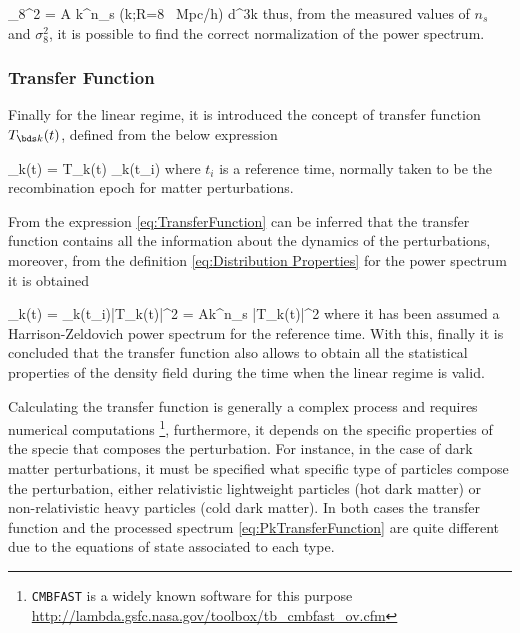 { \sigma_8^2 = A\int {} k^{n_s}
 (k;R=8 \mbox{ Mpc}/h) d^3\bds k }
thus, from the measured values of $n_s$ and $\sigma_8^2$, it is possible
to find the correct normalization of the power spectrum.



			\subsubsection*{Transfer Function}
			

Finally for the linear regime, it is introduced the concept of transfer 
function $T_{\bds k}(t)$, defined from the below expression


{ \delta_{\bds k}(t) = T_{\bds k}(t) \delta_{\bds k}(t_i) }
where $t_i$ is a reference time, normally taken to be the recombination 
epoch for matter perturbations.


From the expression \ref{eq:TransferFunction} can be inferred that the 
transfer function contains all the information about the dynamics of the
perturbations, moreover, from the definition \ref{eq:Distribution 
Properties} for the power spectrum it is obtained


{ \sigma_k(t) = \sigma_k(t_i)|T_k(t)|^2 = Ak^{n_s} |T_k(t)|^2 }
where it has been assumed a Harrison-Zeldovich power spectrum for the 
reference time. With this, finally it is concluded that the transfer 
function also allows to obtain all the statistical properties of the 
density field during the time when the linear regime is valid.


Calculating the transfer function is generally a complex process and 
requires numerical computations \footnote{\texttt{CMBFAST} is a 
widely known software for this purpose 
\url{http://lambda.gsfc.nasa.gov/toolbox/tb_cmbfast_ov.cfm}}, 
furthermore, it depends on the specific properties of the specie that 
composes the perturbation. For instance, in the case of dark matter 
perturbations, it must be specified what specific type of particles 
compose the perturbation, either relativistic lightweight particles (hot 
dark matter) or non-relativistic heavy particles (cold dark matter). In
both cases the transfer function and the processed spectrum 
\ref{eq:PkTransferFunction} are quite different due to the equations of
state associated to each type.


